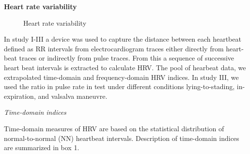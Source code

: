 \documentclass[
  a4paper,
  headsepline=true,
  open=any]{scrbook}
\begin{document}
\textbf{Heart rate variability}

\begin{figure}

\begin{minipage}[t]{\linewidth}

{\centering 


\caption{Heart rate variability}

}

\end{minipage}%

\end{figure}

In study I-III a device was used to capture the distance between each
heartbeat defined as RR intervals from electrocardiogram traces either
directly from heart-beat traces or indirectly from pulse traces. From
this a sequence of successive heart beat intervals is extracted to
calculate HRV. The pool of hearbeat data, we extrapolated time-domain
and frequency-domain HRV indices. In study III, we used the ratio in
pulse rate in test under different conditions lying-to-stading, in-
expiration, and valsalva maneuvre.

\emph{Time-domain indices}

Time-domain measures of HRV are based on the statistical distribution of
normal-to-normal (NN) heartbeat intervals. Description of time-domain
indices are summarized in box 1.
\end{document}
